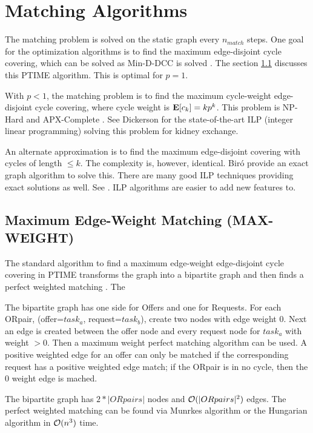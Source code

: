 \documentclass[main.tex]{subfiles}
\begin{document}
\section{Matching Algorithms}
The matching problem is solved on the static graph every $n_{match}$ steps. One goal for the optimization algorithms is to find the maximum edge-disjoint cycle covering, which can be solved as Min-D-DCC is solved \cite{Man1} \cite{Bir}. The section \ref{bima} discusses this PTIME algorithm. This is optimal for $p=1$.

With $p<1$, the matching problem is to find the maximum cycle-weight edge-disjoint cycle covering, where cycle weight is $\mathbf{E}[c_k] = k p^k$. This problem is NP-Hard and APX-Complete \cite{Bir}. See Dickerson \cite{Dick} \cite{Dick3} for the state-of-the-art ILP (integer linear programming) solving this problem for kidney exchange.

An alternate approximation is to find the maximum edge-disjoint covering with cycles of length $\leq k$. The complexity is, however, identical. Bir\'{o} \cite{Bir} provide an exact graph algorithm to solve this. There are many good ILP techniques providing exact solutions as well. See \cite{And3} \cite{Glo1} \cite{Pla} \cite{Dick1}. ILP algorithms are easier to add new features to.

\subsection{Maximum Edge-Weight Matching (MAX-WEIGHT)}\label{bima}

The standard algorithm to find a maximum edge-weight edge-disjoint cycle covering in PTIME transforms the graph into a bipartite graph and then finds a perfect weighted matching \cite{Bir}. The

The bipartite graph has one side for Offers and one for Requests. For each ORpair, (offer=$task_a$, request=$task_b$), create two nodes with edge weight $0$. Next an edge is created between the offer node and every request node for $task_a$ with weight $> 0$. Then a maximum weight perfect matching algorithm can be used. A positive weighted edge for an offer can only be matched if the corresponding request has a positive weighted edge match; if the ORpair is in no cycle, then the $0$ weight edge is mached.

The bipartite graph has $2*|ORpairs|$ nodes and $\mathcal{O}(|ORpairs|^2)$ edges. The perfect weighted matching can be found via Munrkes algorithm or the Hungarian algorithm in $\mathcal{O}(n^3)$ time.
\end{document}
